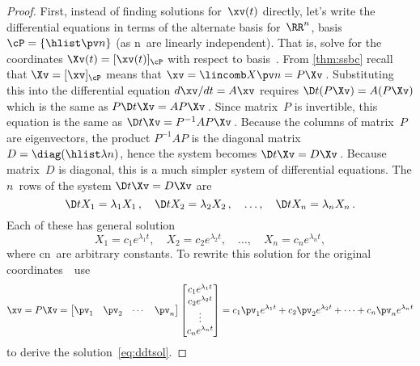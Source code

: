 \begin{proof} 
First, instead of finding solutions for~\(\xv(t)\) directly, let's write the differential equations in terms of the alternate basis for~\(\RR^n\), basis \(\cP=\{\hlist\pv n\}\) (as \hlist\pv n\ are linearly independent).
That is, solve for the coordinates \(\Xv(t)=[\xv(t)]_\cP\) with respect to basis~\cP.
From \cref{thm:ssbc} recall that  \(\Xv=[\xv]_\cP\) means that \(\xv=\lincomb X\pv n=P\Xv\)\,.
Substituting this into the differential equation \(d\xv/dt=A\xv\) requires \(\D t{}(P\Xv)=A(P\Xv)\) which is the same as \(P\D t\Xv=AP\Xv\)\,.
Since matrix~\(P\) is invertible, this equation is the same as \(\D t\Xv=P^{-1}AP\Xv\)\,.
Because the columns of matrix~\(P\) are eigenvectors, the product \(P^{-1}AP\) is the diagonal matrix \(D=\diag(\hlist\lambda n)\), hence the system becomes \(\D t\Xv=D\Xv\)\,.
Because matrix~\(D\) is diagonal, this is a much simpler system of differential equations.
The \(n\)~rows of the system \(\D t\Xv=D\Xv\) are
\begin{equation*}
\D t{X_1}=\lambda_1X_1\,,\quad
\D t{X_2}=\lambda_2X_2\,,\quad \ldots,\quad
\D t{X_n}=\lambda_nX_n\,.
\end{equation*}
Each of these has general solution
\begin{equation*}
X_1=c_1e^{\lambda_1t},\quad
X_2=c_2e^{\lambda_2t},\quad \ldots,\quad
X_n=c_ne^{\lambda_nt},
\end{equation*}
where \hlist cn\ are arbitrary constants.
To rewrite this solution for the original coordinates~\xv\ use
\begin{equation*}
\xv = P\Xv
=\begin{bmatrix} \pv_1&\pv_2&\cdots&\pv_n \end{bmatrix}
\begin{bmatrix} c_1e^{\lambda_1t}
\\c_2e^{\lambda_2t}
\\\vdots
\\c_ne^{\lambda_nt} \end{bmatrix}
= c_1\pv_1e^{\lambda_1t}+c_2\pv_2e^{\lambda_2t}+\cdots+c_n\pv_ne^{\lambda_nt}
\end{equation*}
to derive the solution~\eqref{eq:ddtsol}.


\end{proof}
